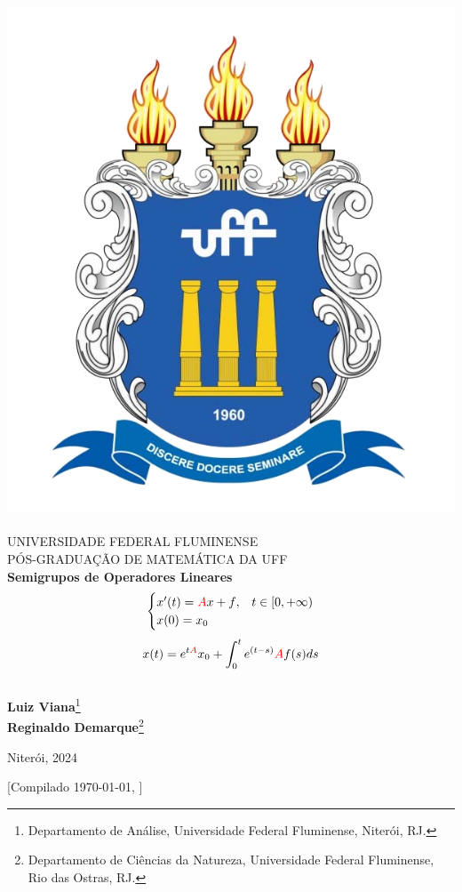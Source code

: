 \documentclass[12pt]{book}
\theoremstyle{definition}
\theoremstyle{remark}
\numberwithin{section}{chapter}
\numberwithin{equation}{chapter}
\begin{document}
\begin{titlepage}
\begin{center}
\includegraphics[scale=0.15]{brasao-cor.png}~\\
UNIVERSIDADE FEDERAL FLUMINENSE \\
PÓS-GRADUAÇÃO DE MATEMÁTICA DA UFF\\[4cm]
{\Huge \textbf{Semigrupos de Operadores Lineares}}\\
{\Large
\begin{equation*}
\begin{cases}
x'(t)={\color{red}A}x+{\color{black}f},& t\in [0,+\infty)\\
x(0)=x_0
\end{cases}
\end{equation*}
\begin{equation*}
x(t)=e^{t\color{red}A}x_0+\int_0^t e^{(t-s)}{\color{red}A}f(s)ds
\end{equation*}}\\[1cm]
\textbf{Luiz Viana}\footnote{Departamento de Análise, Universidade Federal Fluminense, Niterói, RJ.}\\
\textbf{Reginaldo Demarque}\footnote{Departamento de Ciências da Natureza, Universidade Federal Fluminense, Rio das Ostras, RJ.}\\
\vfill

{\large Niterói, 2024}

[Compilado \today, \currenttime] 
\par
\end{center}
\end{titlepage}
\end{document}
